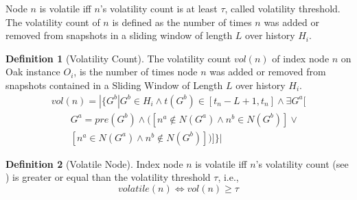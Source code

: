 \documentclass[abstracton,12pt]{scrartcl}
\theoremstyle{definition}
\newtheorem{definition}{Definition}
\begin{document}
Node $n$ is volatile iff $n$'s volatility count is at least $\tau$, called
volatility threshold. The volatility count of $n$ is defined as the number of
times $n$ was added or removed from snapshots in a sliding window of length
$L$ over history $H_i$.

\begin{definition}[Volatility Count]
  The volatility count $vol(n)$ of index node $n$ on Oak instance $O_i$, is the number of
  times node $n$ was added or removed from snapshots contained in a Sliding
  Window of Length $L$ over history $H_i$.
  \vspace{3mm}
  \begin{align*}
    vol(n) = | \{ G^b | G^b \in H_i \land t(G^b) \in [t_n-L+1, t_n] \land \exists G^a[ \\
    \qquad G^a = pre(G^b) \land ([n^a \notin N(G^a) \land n^b \in N(G^b)]\lor \\
    \qquad [n^a \in N(G^a) \land n^b \notin N(G^b)] )]\} |
  \end{align*}
  \vspace{-4mm}
  \label{def:vol_count}
\end{definition}

\vspace{-4mm}

\begin{definition}[Volatile Node]
  Index node $n$ is volatile iff $n$'s volatility count (see
  ) is greater or equal than the volatility threshold
  $\tau$, i.e.,
  $$ volatile(n) \iff vol(n) \geq \tau $$
  \label{def:volatile_node}
\end{definition}

\vspace{-4mm}
\end{document}
